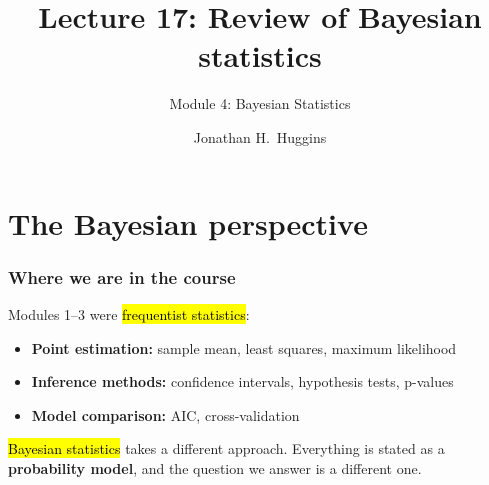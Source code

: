 \documentclass[slidestop,compress,mathserif]{beamer}
\title[Lecture 17]{Lecture 17: Review of Bayesian statistics}
\subtitle{Module 4: Bayesian Statistics}
\author{Jonathan H.~Huggins}
\institute{}
\date{}
\begin{document}

\maketitleframe



\section{The Bayesian perspective}

\begin{frame}
\frametitle{Where we are in the course}

Modules 1--3 were \hl{frequentist statistics}:
\begin{itemize}
\item \textbf{Point estimation:} sample mean, least squares, maximum likelihood
\item \textbf{Inference methods:} confidence intervals, hypothesis tests, p-values
\item \textbf{Model comparison:} AIC, cross-validation
\end{itemize}

\pause
\medskip

\hl{Bayesian statistics} takes a different approach. Everything is stated as a \textbf{probability model}, and the question we answer is a different one.

\end{frame}
\end{document}
